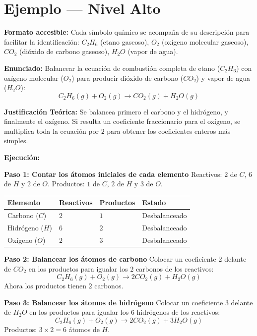 \documentclass[
  spanish,
  letterpaper,
  12pt,
  oneside,
  open=any]{scrbook}
\newcounter{none} %
\newcommand{\setcolorsection}[2]{%
  \definecolor{currentsectionbg}{HTML}{#1}%
  \definecolor{currentsectionborder}{HTML}{#2}%
}
\begin{document}
\setcolorsection{b3d9f0}{94c4e0}

\section{Ejemplo --- Nivel Alto}\label{ejemplo-nivel-alto-1}

\textbf{Formato accesible:} Cada símbolo químico se acompaña de su
descripción para facilitar la identificación: \(C_2H_6\) (etano
gaseoso), \(O_2\) (oxígeno molecular gaseoso), \(CO_2\) (dióxido de
carbono gaseoso), \(H_2O\) (vapor de agua).

\textbf{Enunciado:} Balancear la ecuación de combustión completa de
etano (\(C_2H_6\)) con oxígeno molecular (\(O_2\)) para producir dióxido
de carbono (\(CO_2\)) y vapor de agua (\(H_2O\)):
\[C_2H_6(g) + O_2(g) \rightarrow CO_2(g) + H_2O(g)\]

\textbf{Justificación Teórica:} Se balancea primero el carbono y el
hidrógeno, y finalmente el oxígeno. Si resulta un coeficiente
fraccionario para el oxígeno, se multiplica toda la ecuación por \(2\)
para obtener los coeficientes enteros más simples.

\textbf{Ejecución:}

\textbf{Paso 1: Contar los átomos iniciales de cada elemento} Reactivos:
\(2\) de \(C\), \(6\) de \(H\) y \(2\) de \(O\). Productos: \(1\) de
\(C\), \(2\) de \(H\) y \(3\) de \(O\).

{\def\LTcaptype{none} %
\begin{longtable}[]{@{}llll@{}}
\toprule\noalign{}
Elemento & Reactivos & Productos & Estado \\
\midrule\noalign{}
\endhead
\bottomrule\noalign{}
\endlastfoot
Carbono (\(C\)) & \(2\) & \(1\) & Desbalanceado \\
Hidrógeno (\(H\)) & \(6\) & \(2\) & Desbalanceado \\
Oxígeno (\(O\)) & \(2\) & \(3\) & Desbalanceado \\
\end{longtable}
}

\textbf{Paso 2: Balancear los átomos de carbono} Colocar un coeficiente
\(2\) delante de \(CO_2\) en los productos para igualar los \(2\)
carbonos de los reactivos:
\[C_2H_6(g) + O_2(g) \rightarrow 2CO_2(g) + H_2O(g)\] Ahora los
productos tienen \(2\) carbonos.

\textbf{Paso 3: Balancear los átomos de hidrógeno} Colocar un
coeficiente \(3\) delante de \(H_2O\) en los productos para igualar los
\(6\) hidrógenos de los reactivos:
\[C_2H_6(g) + O_2(g) \rightarrow 2CO_2(g) + 3H_2O(g)\] Productos:
\(3 \times 2 = 6\) átomos de \(H\).
\end{document}

